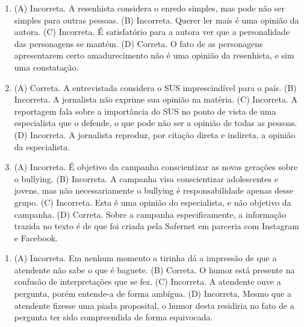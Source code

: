 
\begin{enumerate}
\item (A) Incorreta. A resenhista considera o enredo simples, mas pode não ser
simples para outras pessoas.
(B) Incorreta. Querer ler mais é uma opinião da autora.
(C) Incorreta. É satisfatório para a autora ver que a personalidade das
personagens se mantém.
(D) Correta. O fato de as personagens apresentarem certo amadurecimento
não é uma opinião da resenhista, e sim uma constatação.

\item (A) Correta. A entrevistada considera o SUS imprescindível para o país.
(B) Incorreta. A jornalista não exprime sua opinião na matéria.
(C) Incorreta. A reportagem fala sobre a importância do SUS no ponto de
vista de uma especialista que o defende, o que pode não ser a opinião de
todas as pessoas.
(D) Incorreta. A jornalista reproduz, por citação direta e indireta, a
opinião da especialista.

\item (A) Incorreta. É objetivo da campanha conscientizar as novas gerações
sobre o bullying.
(B) Incorreta. A campanha visa conscientizar adolescentes e jovens, mas
não necessariamente o bullying é responsabilidade apenas desse grupo.
(C) Incorreta. Esta é uma opinião do especialista, e não objetivo da
campanha.
(D) Correta. Sobre a campanha especificamente, a informação trazida no
texto é de que foi criada pela Safernet em parceria com Instagram e
Facebook.
\end{enumerate}


\begin{enumerate}
\item (A) Incorreta. Em nenhum momento a tirinha dá a impressão de que a
atendente não sabe o que é baguete.
(B) Correta. O humor está presente na confusão de interpretações que se fez.
(C) Incorreta. A atendente ouve a pergunta, porém entende-a de forma
ambígua.
(D) Incorreta. Mesmo que a atendente fizesse uma piada proposital, o
humor desta residiria no fato de a pergunta ter sido compreendida de forma equivocada.
\end{enumerate}


